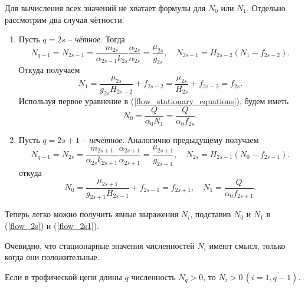         Для вычисления всех значений не хватает формулы для \(N_0\) или \(N_1\). Отдельно рассмотрим два случая чётности.
        \begin{enumerate}
            \item Пусть \(q = 2s\) -- \textit{чётное}. Тогда
            \begin{equation*}
                N_{q-1} = N_{2s-1} = \frac{m_{2s}}{\alpha_{2s-1} k_{2s}} \frac{\alpha_{2s}}{\alpha_{2s}} = \frac{\mu_{2s}}{g_{2s}}, \quad N_{2s-1} = H_{2s-2} (N_1 - f_{2s-2}).
            \end{equation*}
            Откуда получаем
            \begin{equation*}
                N_1 = \frac{\mu_{2s}}{g_{2s} H_{2s-2}} + f_{2s-2} = \frac{\mu_{2s}}{H_{2s}} + f_{2s-2} = f_{2s}.
            \end{equation*}
            Используя первое уравнение в (\ref{flow_stationary_equations}), будем иметь
            \begin{equation*}
                N_0 = \frac{Q}{\alpha_0 N_1} = \frac{Q}{\alpha_0 f_{2s}}.
            \end{equation*}

            \item Пусть \(q = 2s+1\) -- \textit{нечётное}. Аналогично предыдущему получаем
            \begin{equation*}
                N_{q-1} = N_{2s} = \frac{m_{2s+1}}{\alpha_{2s} k_{2s+1}} \frac{\alpha_{2s+1}}{\alpha_{2s+1}} = \frac{\mu_{2s+1}}{g_{2s+1}}, \quad N_{2s} = H_{2s-1} (N_0 - f_{2s-1}).
            \end{equation*} 
            откуда
            \begin{equation*}
                N_0 = \frac{\mu_{2s+1}}{g_{2s+1} H_{2s-1}} + f_{2s-1} = f_{2s+1}, \quad N_1 = \frac{Q}{\alpha_0 f_{2s+1}}.
            \end{equation*}
        \end{enumerate}

        Теперь легко можно получить явные выражения \(N_i\), подставив \(N_0\) и \( N_1\) в (\ref{flow_2s}) и (\ref{flow_2s1}).

        Очевидно, что стационарные значения численностей \(N_i\) имеют смысл, только когда они положительные.

        \begin{statement}
            Если в трофической цепи длины \(q\) численность \(N_q > 0\), то \(N_i > 0 \, (i=\overline{1,q-1})\).
        \end{statement}

